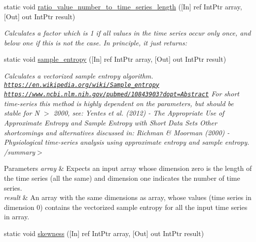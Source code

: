 \begin{DoxyCompactItemize}
\begin{DoxyCompactList}
\end{DoxyCompactList}\item 
static void \mbox{\hyperlink{classkhiva_1_1interop_1_1_d_l_l_features_ad0e8e20fb0297eb7165724286bd159ed}{ratio\+\_\+value\+\_\+number\+\_\+to\+\_\+time\+\_\+series\+\_\+length}} (\mbox{[}In\mbox{]} ref Int\+Ptr array, \mbox{[}Out\mbox{]} out Int\+Ptr result)
\begin{DoxyCompactList}\small\item\em Calculates a factor which is 1 if all values in the time series occur only once, and below one if this is not the case. In principle, it just returns\+: \end{DoxyCompactList}\item 
static void \mbox{\hyperlink{classkhiva_1_1interop_1_1_d_l_l_features_adbc8254807e97c7d248744aaa1722ed9}{sample\+\_\+entropy}} (\mbox{[}In\mbox{]} ref Int\+Ptr array, \mbox{[}Out\mbox{]} out Int\+Ptr result)
\begin{DoxyCompactList}\small\item\em Calculates a vectorized sample entropy algorithm. \href{https://en.wikipedia.org/wiki/Sample_entropy}{\tt https\+://en.\+wikipedia.\+org/wiki/\+Sample\+\_\+entropy} \href{https://www.ncbi.nlm.nih.gov/pubmed/10843903?dopt=Abstract}{\tt https\+://www.\+ncbi.\+nlm.\+nih.\+gov/pubmed/10843903?dopt=\+Abstract} For short time-\/series this method is highly dependent on the parameters, but should be stable for N $>$ 2000, see\+: Yentes et al. (2012) -\/ The Appropriate Use of Approximate Entropy and Sample Entropy with Short Data Sets Other shortcomings and alternatives discussed in\+: Richman \& Moorman (2000) -\/ Physiological time-\/series analysis using approximate entropy and sample entropy. /summary$>$ 
\begin{DoxyParams}{Parameters}
{\em array} & Expects an input array whose dimension zero is the length of the time series (all the same) and dimension one indicates the number of time series.\\
\hline
{\em result} & An array with the same dimensions as array, whose values (time series in dimension 0) contains the vectorized sample entropy for all the input time series in array.\\
\hline
\end{DoxyParams}
\end{DoxyCompactList}\item 
static void \mbox{\hyperlink{classkhiva_1_1interop_1_1_d_l_l_features_a4f22bda60315614bcc21fd2d7467f821}{skewness}} (\mbox{[}In\mbox{]} ref Int\+Ptr array, \mbox{[}Out\mbox{]} out Int\+Ptr result)

\end{DoxyCompactItemize}
